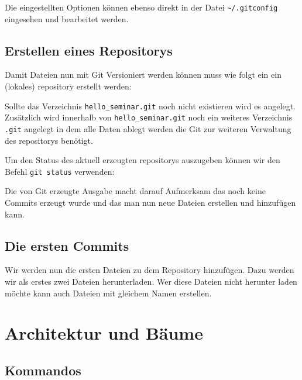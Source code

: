 Die eingestellten Optionen können ebenso direkt in der Datei
\texttt{\textasciitilde/.gitconfig} eingesehen und bearbeitet werden.

\subsection{Erstellen eines Repositorys}\label{startup}
Damit Dateien nun mit Git Versioniert werden können muss wie folgt ein ein (lokales)
\gls{repository} erstellt werden: 



Sollte das Verzeichnis \texttt{hello\_seminar.git} noch nicht existieren wird es
angelegt. Zusätzlich wird innerhalb von \texttt{hello\_seminar.git} noch ein
weiteres Verzeichnis \texttt{.git} angelegt in dem alle Daten ablegt werden die
Git zur weiteren Verwaltung des \glspl{repository} benötigt.

Um den Status des aktuell erzeugten \glspl{repository} auszugeben können wir
den Befehl \texttt{git status} verwenden:



Die von Git erzeugte Ausgabe macht darauf Aufmerksam das noch keine Commits
erzeugt wurde und das man nun neue Dateien erstellen und hinzufügen kann. 

\subsection{Die ersten Commits}\label{first_commits}

Wir werden nun die ersten Dateien zu dem Repository hinzufügen. Dazu werden wir
als erstes zwei Dateien herunterladen. Wer diese Dateien nicht herunter laden
möchte kann auch Dateien mit gleichem Namen erstellen.



\section{Architektur und Bäume}\label{sec:trees}
\label{sec:Konfiguration}
\subsection{Kommandos}
\label{sec:Kommandos}
